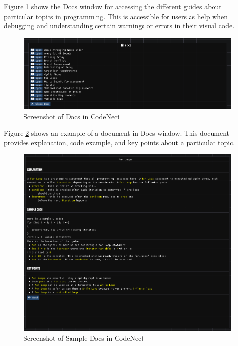 \parx
Figure \ref{fig:cn_docs} shows the Docs window for accessing the different
guides about particular topics in programming. This is accessible for users as
help when debugging and understanding certain warnings or errors in their
visual code.

\begin{figure}[H]
	\centering
	\captionsetup{justification=centering}
	\captionsetup[figure]{list=yes}
	\includegraphics[width=\linewidth]{media/sc_docs.png}
	\caption[Screenshot of Docs in CodeNect]{Screenshot of Docs in CodeNect}
	\label{fig:cn_docs}
\end{figure}

\parx
Figure \ref{fig:cn_docs_sample} shows an example of a document in Docs window.
This document provides explanation, code example, and key points about
a particular topic.

\begin{figure}[H]
	\centering
	\captionsetup{justification=centering}
	\captionsetup[figure]{list=yes}
	\includegraphics[width=\linewidth]{media/sc_docs_sample_for_loops.png}
	\caption[Screenshot of Sample Docs in CodeNect]{Screenshot of Sample Docs in CodeNect}
	\label{fig:cn_docs_sample}
\end{figure}
